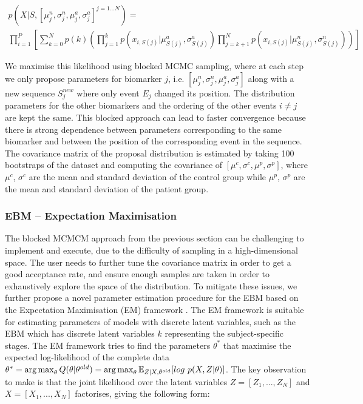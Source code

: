 \begin{multline}
\label{ap:ebmExplicit}
 p(X|S, [\mu^n_j, \sigma^n_j, \mu^a_j, \sigma^a_j]^{j=1 \dots N}) = \\ \prod_{i=1}^P \left[ \sum_{k=0}^N p(k) \left( \prod_{j=1}^k p\left(x_{i,S(j)} | \mu^a_{S(j)}, \sigma^a_{S(j)} \right) \prod_{j=k+1}^N p\left(x_{i,S(j)} | \mu^n_{S(j)}, \sigma^n_{S(j)} \right) \right) \right]
\end{multline}


We maximise this likelihood using blocked MCMC sampling, where at each step we only propose parameters for biomarker $j$, i.e. $[\mu^n_j, \sigma^n_j, \mu^a_j, \sigma^a_j]$ along with a new sequence $S_j^{new}$ where only event $E_j$ changed its position. The distribution parameters for the other biomarkers and the ordering of the other events $i \neq j$ are kept the same. This blocked approach can lead to faster convergence because there is strong dependence between parameters corresponding to the same biomarker and between the position of the corresponding event in the sequence. The covariance matrix of the proposal distribution is estimated by taking 100 bootstraps of the dataset and computing the covariance of $[\mu^c, \sigma^c, \mu^p, \sigma^p]$, where $\mu^c$, $\sigma^c$ are the mean and standard deviation of the control group while $\mu^p$, $\sigma^p$ are the mean and standard deviation of the patient group.

\subsubsection{EBM -- Expectation Maximisation}
\label{sec:ebmEM}

The blocked MCMCM approach from the previous section can be challenging to implement and execute, due to the difficulty of sampling in a high-dimensional space. The user needs to further tune the covariance matrix in order to get a good acceptance rate, and ensure enough samples are taken in order to exhaustively explore the space of the distribution. To mitigate these issues, we further propose a novel parameter estimation procedure for the EBM based on the Expectation Maximisation (EM) framework \cite{bishop2007pattern}. The EM framework is suitable for estimating parameters of models with discrete latent variables, such as the EBM which has discrete latent variables $k$ representing the subject-specific stages. The EM framework tries to find the parameters $\theta^*$ that maximise the expected log-likelihood of the complete data $\theta^* = \argmax_{\theta} Q(\theta | \theta^{old}) = \argmax_{\theta} \mathbb{E}_{Z|X,\theta^{old}}[log\ p(X,Z|\theta)]$. The key observation to make is that the joint likelihood over the latent variables $Z = [Z_1, ..., Z_N]$ and $X = [X_1, ..., X_N]$ factorises, giving the following form:

